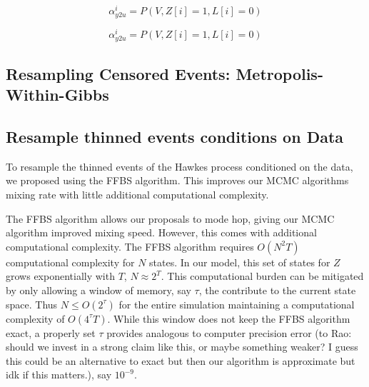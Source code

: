 \documentclass[11pt]{article}
\newcommand{\algrule}[1][.2pt]{\par\vskip.5\baselineskip\hrule height #1\par\vskip.5\baselineskip}
\begin{document}


\[
  \alpha_{y2u}^i
  =
  P(V,Z[i] = 1, L[i] = 0)
\]


\[
  \alpha_{y2u}^i
  =
  P(V,Z[i] = 1, L[i] = 0)
\]

\subsection{Resampling Censored Events: Metropolis-Within-Gibbs}


\subsection{Resample thinned events conditions on Data}

To resample the thinned events of the Hawkes process conditioned on the data, we proposed using the FFBS algorithm. This improves our MCMC algorithms mixing rate with little additional computational complexity.



The FFBS algorithm allows our proposals to mode hop, giving our MCMC algorithm improved mixing speed. However, this comes with additional computational complexity. The FFBS algorithm requires $O(N^2T)$ computational complexity for $N$ states. In our model, this set of states for $Z$ grows exponentially with $T$, $N \approx 2^T$. This computational burden can be mitigated by only allowing a window of memory, say $\tau$, the contribute to the current state space. Thus $N \leq O(2^\tau)$ for the entire simulation maintaining a computational complexity of $O(4^{\tau} T)$. While this window does not keep the FFBS algorithm exact, a properly set $\tau$ provides analogous to computer precision error (to Rao: should we invest in a strong claim like this, or maybe something weaker? I guess this could be an alternative to exact but then our algorithm is approximate but idk if this matters.), say $10^{-9}$.
\end{document}
